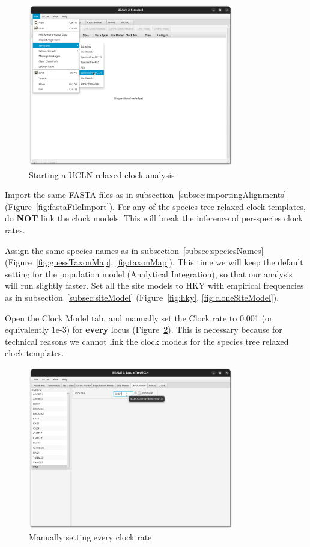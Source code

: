 \documentclass[12pt]{article}
\begin{document}
\begin{figure}[htb!]
\centering
\includegraphics[width=0.8\textwidth]{figures/speciesTreeUCLN.png}
\caption
{Starting a UCLN relaxed clock analysis}
\label{fig:speciesTreeUCLN}
\end{figure}

Import the same FASTA files as in
subsection~\ref{subsec:importingAlignments}
(Figure~\ref{fig:fastaFileImport}). For any of the species tree relaxed clock
templates, do \textbf{NOT} link the clock models. This will break the inference
of per-species clock rates.

Assign the same species names as in
subsection~\ref{subsec:speciesNames} (Figure~\ref{fig:guessTaxonMap}, \ref{fig:taxonMap}). This time
we will keep the default setting for the population model (Analytical Integration), so that our analysis will run slightly faster. Set all
the site models to HKY with empirical frequencies as in
subsection~\ref{subsec:siteModel} (Figure~\ref{fig:hky}, \ref{fig:cloneSiteModel}).

Open the Clock Model tab, and manually set the Clock.rate to 0.001 (or
equivalently 1e-3) for \textbf{every} locus (Figure~\ref{fig:uclnClockRates}).
This is necessary because for technical reasons we cannot link the clock
models for the species tree relaxed clock templates.

\begin{figure}[htb!]
\centering
\includegraphics[width=0.8\textwidth]{figures/uclnClockRates.png}
\caption
{Manually setting every clock rate}
\label{fig:uclnClockRates}
\end{figure}
\end{document}

